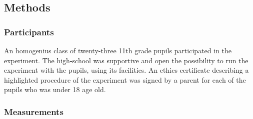 \documentclass[a4paper,11pt]{article}
\begin{document}
{

\subsection{Methods}\label{methods:evaluation}

\subsubsection{Participants}

An homogenius class of twenty-three 11th grade pupils participated in the experiment.
The high-school was supportive and open the possibility to run the experiment with the pupils, using its facilities.
An ethics certificate describing a highlighted procedure of the experiment was signed by a parent for each of the pupils who was under 18 age old.

\subsubsection{Measurements}

}
\end{document}
